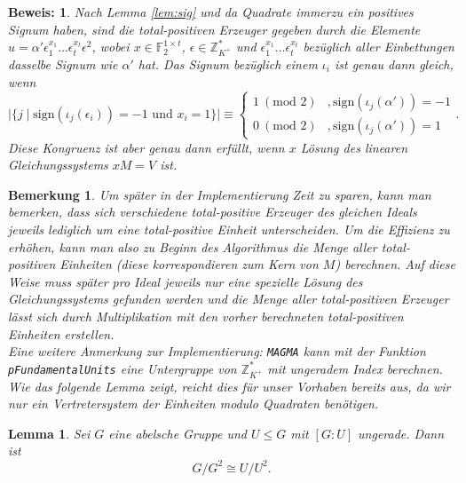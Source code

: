 \documentclass[12pt,a4paper,halfparskip,headsepline,bibtotocnumbered]{scrreprt}
\theoremstyle{nummermitklammern}
\newtheorem{lemma}[defsatzusw]{Lemma}
\newtheorem{bemerkung}[defsatzusw]{Bemerkung}
\theoremstyle{nonumberbreak}
\newtheorem{beweis}{Beweis:}
\newcommand{\Z}{\mathbb{Z}}
\newcommand{\F}{\mathbb{F}}
\begin{document}
\begin{beweis}
	Nach Lemma \eqref{lem:sig} und da Quadrate immerzu ein positives Signum haben, sind die total-positiven Erzeuger gegeben durch die Elemente $u = \alpha' \epsilon_1^{x_1} \dots \epsilon_t^{x_t} \epsilon^2$, wobei $x \in \F_2^{1 \times t}$, $\epsilon \in \Z_{K^+}^\ast$ und $\epsilon_1^{x_1} \dots \epsilon_t^{x_t}$ bezüglich aller Einbettungen dasselbe Signum wie $\alpha'$ hat. Das Signum bezüglich einem $\iota_i$ ist genau dann gleich, wenn
	\begin{equation*}
		\vert \lbrace j \mid \text{sign}(\iota_j(\epsilon_i)) = -1 \text{ und } x_i = 1 \rbrace \vert \equiv \begin{cases} 1 \ (\text{mod } 2) &,\text{sign}(\iota_j(\alpha')) = -1 \\ 0 \ (\text{mod } 2) &,\text{sign}(\iota_j(\alpha')) = 1 \end{cases}.
	\end{equation*}
	Diese Kongruenz ist aber genau dann erfüllt, wenn $x$ Lösung des linearen Gleichungssystems $xM = V$ ist.
\end{beweis}

\begin{bemerkung}
	Um später in der Implementierung Zeit zu sparen, kann man bemerken, dass sich verschiedene total-positive Erzeuger des gleichen Ideals jeweils lediglich um eine total-positive Einheit unterscheiden. Um die Effizienz zu erhöhen, kann man also zu Beginn des Algorithmus die Menge aller total-positiven Einheiten (diese korrespondieren zum Kern von $M$) berechnen. Auf diese Weise muss später pro Ideal jeweils nur eine spezielle Lösung des Gleichungssystems gefunden werden und die Menge aller total-positiven Erzeuger lässt sich durch Multiplikation mit den vorher berechneten total-positiven Einheiten erstellen.\\
	Eine weitere Anmerkung zur Implementierung: \texttt{MAGMA} kann mit der Funktion\linebreak
	 \texttt{pFundamentalUnits} eine Untergruppe von $\Z_{K^+}^\ast$ mit ungeradem Index berechnen. Wie das folgende Lemma zeigt, reicht dies für unser Vorhaben bereits aus, da wir nur ein Vertretersystem der Einheiten modulo Quadraten benötigen.
\end{bemerkung}

\begin{framed}
	\begin{lemma}
		Sei $G$ eine abelsche Gruppe und $U \leq G$ mit $\left[ G : U \right]$ ungerade. Dann ist
		\begin{equation*}
			G / G^2 \cong U / U^2.
		\end{equation*}
	\end{lemma}
\end{framed}
\end{document}
